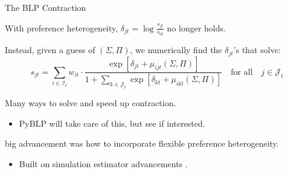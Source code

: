 \documentclass[aspectratio=169,t,11pt,table]{beamer}
\begin{document}
\begin{frame}{The BLP Contraction}
    \begin{wideitemize}
        \item With preference heterogeneity, $\delta_{jt} = \log\frac{s_{jt}}{s_{0t}}$ no longer holds.
        \pause
        \item Instead, given a guess of $(\Sigma, \Pi)$, we numerically find the $\delta_{jt}$'s that solve:
        \begin{equation*}
            s_{jt} = \sum_{i \in \mathcal{I}_t} w_{it} \cdot \frac{\exp[\delta_{jt} + \mu_{ijt}(\Sigma, \Pi)]}{1 + \sum_{k \in \mathcal{J}_t} \exp[\delta_{kt} + \mu_{ikt}(\Sigma, \Pi)]} \quad\text{for all}\quad j \in \mathcal{J}_t
        \end{equation*}
        \vspace{-1em}
        \pause
        \item Many ways to solve and speed up contraction.
        \begin{itemize}
            \item PyBLP will take care of this, but see \cite{conlon2020best} if interested.
        \end{itemize}
        \pause
        \item {} big advancement was how to incorporate flexible preference heterogeneity.
        \begin{itemize}
            \item Built on simulation estimator advancements \citep{pakes1989simulation,mcfadden1989method}.
        \end{itemize}
    \end{wideitemize}
\end{frame}
\end{document}
